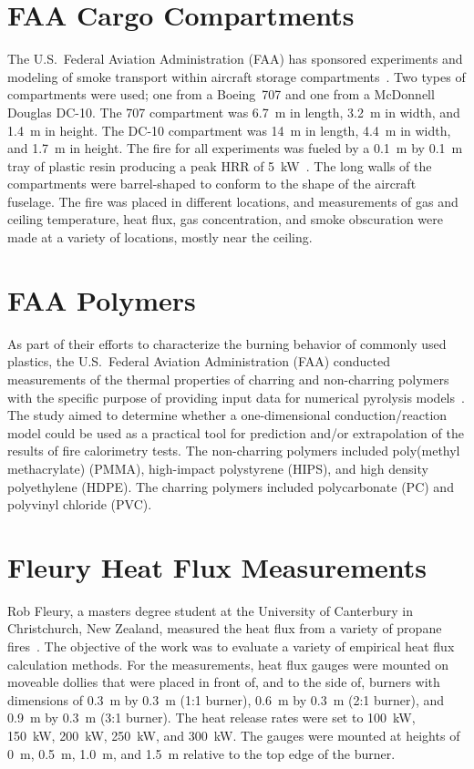 \section{FAA Cargo Compartments}

The U.S.~Federal Aviation Administration (FAA) has sponsored experiments and modeling of smoke transport within aircraft storage compartments~\cite{FAA-AR-03-49,FAA-AR-07-27}. Two types of compartments were used; one from a Boeing~707 and one from a McDonnell Douglas DC-10. The 707 compartment was 6.7~m in length, 3.2~m in width, and 1.4~m in height. The DC-10 compartment was 14~m in length, 4.4~m in width, and 1.7~m in height. The fire for all experiments was fueled by a 0.1~m by 0.1~m tray of plastic resin producing a peak HRR of 5~kW~\cite{FAA-AR-06-21}. The long walls of the compartments were barrel-shaped to conform to the shape of the aircraft fuselage. The fire was placed in different locations, and measurements of gas and ceiling temperature, heat flux, gas concentration, and smoke obscuration were made at a variety of locations, mostly near the ceiling.


\section{FAA Polymers}

As part of their efforts to characterize the burning behavior of commonly used plastics, the U.S.~Federal Aviation Administration (FAA) conducted measurements of the thermal properties of charring and non-charring polymers with the specific purpose of providing input data for numerical pyrolysis models~\cite{Stoliarov:CF2009,Stoliarov:CF2010}. The study aimed to determine whether a one-dimensional conduction/reaction model could be used as a practical tool for prediction and/or extrapolation of the results of fire calorimetry tests. The non-charring polymers included poly(methyl methacrylate) (PMMA), high-impact polystyrene (HIPS), and high density polyethylene (HDPE). The charring polymers included polycarbonate (PC) and polyvinyl chloride (PVC).


\section{Fleury Heat Flux Measurements}

Rob Fleury, a masters degree student at the University of Canterbury in Christchurch, New Zealand, measured the heat flux from a variety of propane fires~\cite{Fleury:Masters}.
The objective of the work was to evaluate a variety of empirical heat flux calculation methods. For the measurements, heat flux gauges were mounted on moveable dollies that
were placed in front of, and to the side of, burners with dimensions of 0.3~m by 0.3~m (1:1 burner), 0.6~m by 0.3~m (2:1 burner), and 0.9~m by 0.3~m (3:1 burner). The heat release
rates were set to 100~kW, 150~kW, 200~kW, 250~kW, and 300~kW. The gauges were mounted at heights of 0~m, 0.5~m, 1.0~m, and 1.5~m relative to the top edge of the burner.


